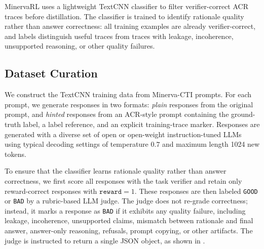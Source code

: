 MinervaRL uses a lightweight TextCNN classifier to filter verifier-correct ACR traces before distillation. The classifier is trained to identify rationale quality rather than answer correctness: all training examples are already verifier-correct, and labels distinguish useful traces from traces with leakage, incoherence, unsupported reasoning, or other quality failures.

\subsection{Dataset Curation}
\label{subsec:textcnn-dataset-curation}

We construct the TextCNN training data from Minerva-CTI prompts. For each prompt, we generate responses in two formats: \emph{plain} responses from the original prompt, and \emph{hinted} responses from an ACR-style prompt containing the ground-truth label, a label reference, and an explicit training-trace marker. Responses are generated with a diverse set of open or open-weight instruction-tuned LLMs using typical decoding settings of temperature $0.7$ and maximum length 1024 new tokens.

To ensure that the classifier learns rationale quality rather than answer correctness, we first score all responses with the task verifier and retain only reward-correct responses with $\texttt{reward}=1$. These responses are then labeled \texttt{GOOD} or \texttt{BAD} by a rubric-based LLM judge. The judge does not re-grade correctness; instead, it marks a response as \texttt{BAD} if it exhibits any quality failure, including leakage, incoherence, unsupported claims, mismatch between rationale and final answer, answer-only reasoning, refusals, prompt copying, or other artifacts. The judge is instructed to return a single JSON object, as shown in .

